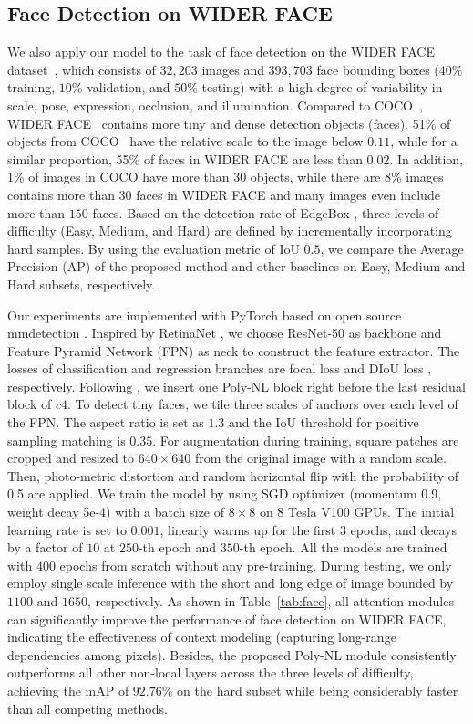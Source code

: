 \documentclass[10pt,twocolumn,letterpaper]{article}
\begin{document}
\subsection{Face Detection on WIDER FACE}
We also apply our model to the task of face detection on the WIDER FACE dataset~\cite{yang2016wider}, which consists of $32,203$ images and $393,703$ face bounding boxes ($40\%$ training, $10\%$ validation, and $50\%$ testing) with a high degree of variability in scale, pose, expression, occlusion, and illumination. Compared to COCO~\cite{lin2014microsoft}, WIDER FACE~\cite{yang2016wider} contains more tiny and dense detection objects (\ie faces). 51\% of objects from COCO~\cite{lin2014microsoft} have the relative scale to the image below $0.11$, while for a similar proportion, 55\% of faces in WIDER FACE are less than $0.02$. In addition, 1\% of images in COCO have more than 30 objects, while there are 8\% images contains more than 30 faces in WIDER FACE and many images even include more than $150$ faces. Based on the detection rate of EdgeBox \cite{zitnick2014edge}, three levels of difficulty (\ie Easy, Medium, and Hard) are defined by incrementally incorporating hard samples. By using the evaluation metric of IoU $0.5$, we compare the Average Precision (AP) of the proposed method and other baselines on Easy, Medium and Hard subsets, respectively. 

Our experiments are implemented with PyTorch based on open source mmdetection \cite{chen2019mmdetection}. Inspired by RetinaNet \cite{lin2017focal}, we choose ResNet-50 \cite{he2016deep} as backbone and Feature Pyramid Network (FPN) \cite{lin2017feature} as neck to construct the feature extractor. The losses of classification and regression branches are focal loss \cite{lin2017focal} and DIoU loss \cite{zheng2020distance}, respectively. Following \cite{wang2018non}, we insert one Poly-NL block right before the last residual block of $c4$. To detect tiny faces, we tile three scales of anchors over each level of the FPN. The aspect ratio is set as $1.3$ and the IoU threshold for positive sampling matching is $0.35$. For augmentation during training, square patches are cropped and resized to $640 \times 640$ from the original image with a random scale. Then, photo-metric distortion and random horizontal flip with the probability of 0.5 are applied. We train the model by using SGD optimizer (momentum 0.9, weight decay 5e-4) with a batch size of $8\times 8$ on 8 Tesla V100 GPUs. The initial learning rate is set to $0.001$, linearly warms up for the first $3$ epochs, and decays by a factor of $10$ at $250$-th epoch and $350$-th epoch. All the models are trained with $400$ epochs from scratch without any pre-training. During testing, we only employ single scale inference with the short and long edge of image bounded by $1100$ and $1650$, respectively. As shown in Table~\ref{tab:face}, all attention modules can significantly improve the performance of face detection on WIDER FACE, indicating the effectiveness of context modeling (\ie capturing long-range dependencies among pixels). Besides, the proposed Poly-NL module consistently outperforms all other non-local layers across the three levels of difficulty, achieving the mAP of $92.76\%$ on the hard subset while being considerably faster than all competing methods.
\end{document}
